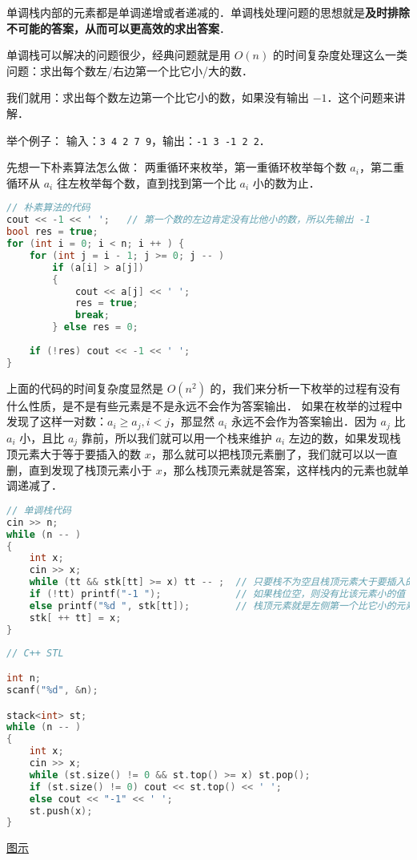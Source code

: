 

单调栈内部的元素都是单调递增或者递减的．单调栈处理问题的思想就是\textbf{及时排除不可能的答案，从而可以更高效的求出答案}．

单调栈可以解决的问题很少，经典问题就是用 $O(n)$ 的时间复杂度处理这么一类问题：求出每个数左/右边第一个比它小/大的数．

我们就用：求出每个数左边第一个比它小的数，如果没有输出 $-1$．这个问题来讲解．

举个例子：
输入：\verb|3 4 2 7 9|，输出：\verb|-1 3 -1 2 2|．

先想一下朴素算法怎么做：
两重循环来枚举，第一重循环枚举每个数 $a_i$，第二重循环从 $a_i$ 往左枚举每个数，直到找到第一个比 $a_i$ 小的数为止．

\begin{lstlisting}[language=cpp]
// 朴素算法的代码
cout << -1 << ' ';   // 第一个数的左边肯定没有比他小的数，所以先输出 -1
bool res = true;
for (int i = 0; i < n; i ++ ) {
    for (int j = i - 1; j >= 0; j -- )
        if (a[i] > a[j])
        {
            cout << a[j] << ' ';
            res = true;
            break;
        } else res = 0;
    
    if (!res) cout << -1 << ' ';
}
\end{lstlisting}

上面的代码的时间复杂度显然是 $O(n^2)$ 的，我们来分析一下枚举的过程有没有什么性质，是不是有些元素是不是永远不会作为答案输出．
如果在枚举的过程中发现了这样一对数：$a_i \geqslant a_j, i < j$，那显然 $a_i$ 永远不会作为答案输出．因为 $a_j$ 比 $a_i$ 小，且比 $a_j$ 靠前，所以我们就可以用一个栈来维护 $a_i$ 左边的数，如果发现栈顶元素大于等于要插入的数 $x$，那么就可以把栈顶元素删了，我们就可以以一直删，直到发现了栈顶元素小于 $x$，那么栈顶元素就是答案，这样栈内的元素也就单调递减了．

\begin{lstlisting}[language=cpp]
// 单调栈代码
cin >> n;
while (n -- )
{
    int x;
    cin >> x;
    while (tt && stk[tt] >= x) tt -- ;  // 只要栈不为空且栈顶元素大于要插入的数 x，那么就删除栈顶元素
    if (!tt) printf("-1 ");             // 如果栈位空，则没有比该元素小的值
    else printf("%d ", stk[tt]);        // 栈顶元素就是左侧第一个比它小的元素
    stk[ ++ tt] = x;
}
\end{lstlisting}

\begin{lstlisting}[language=cpp]
// C++ STL

int n;
scanf("%d", &n);

stack<int> st;
while (n -- )
{
    int x;
    cin >> x;
    while (st.size() != 0 && st.top() >= x) st.pop();
    if (st.size() != 0) cout << st.top() << ' ';
    else cout << "-1" << ' ';
    st.push(x);
}
\end{lstlisting}

\href{https://img-blog.csdnimg.cn/20201211221031165.gif#pic_center}{图示}